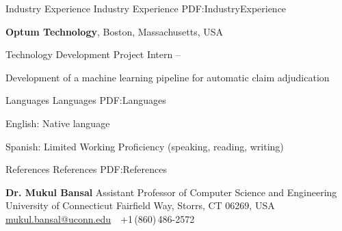 \documentclass[letterpaper,MMMyyyy,nonstopmode]{simpleresumecv}
\begin{document}
\begin{Body}

\Section
{Industry\newline
Experience}
{Industry Experience}
{PDF:IndustryExperience}

\Entry
{\textbf{Optum Technology}},
Boston, Massachusetts, USA

\Gap
\BulletItem
Technology Development Project Intern
\hfill
{} --
\begin{Detail}
\SubBulletItem
Development of a machine learning pipeline for automatic claim adjudication
\end{Detail}






\Section
{Languages}
{Languages}
{PDF:Languages}

\BulletItem
English: Native language

\Gap
\BulletItem
Spanish: Limited Working Proficiency (speaking, reading, writing)









\Section
{References}
{References}
{PDF:References}

\BulletItem
\textbf{Dr. Mukul Bansal}
\newline
Assistant Professor of Computer Science and Engineering
\newline
University of Connecticut
 Fairfield Way, Storrs, CT 06269, USA
\newline
\href{mailto:mukul.bansal@uconn.edu}
{mukul.bansal@uconn.edu}
\,\SubBulletSymbol\,
+1\,(860)\,486-2572


\end{Body}
\end{document}
